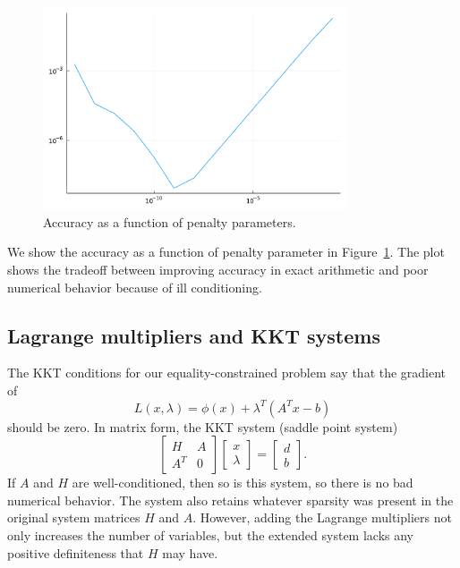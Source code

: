 \documentclass[12pt, leqno]{article} %
\begin{document}
\begin{figure}
\begin{center}
\includegraphics[width=0.8\textwidth]{fig/2023-04-26-penalties.pdf}
\end{center}
\caption{Accuracy as a function of penalty parameters.}
\label{fig:penalties}
\end{figure}

We show the accuracy as a function of penalty parameter
in Figure~\ref{fig:penalties}.  The plot shows the tradeoff between
improving accuracy in exact arithmetic and poor numerical behavior
because of ill conditioning.

\subsection{Lagrange multipliers and KKT systems}

The KKT conditions for our equality-constrained problem say that the
gradient of \[L(x,\lambda) = \phi(x) + \lambda^T (A^T x-b)\] should be
zero. In matrix form, the KKT system (saddle point system)
\[\begin{bmatrix}
    H & A \\
    A^T & 0
  \end{bmatrix}
  \begin{bmatrix} x \\ \lambda \end{bmatrix} =
  \begin{bmatrix} d \\ b \end{bmatrix}.\] If \(A\) and \(H\) are
well-conditioned, then so is this system, so there is no bad numerical
behavior. The system also retains whatever sparsity was present in the
original system matrices \(H\) and \(A\). However, adding the Lagrange
multipliers not only increases the number of variables, but the extended
system lacks any positive definiteness that \(H\) may have.
\end{document}
